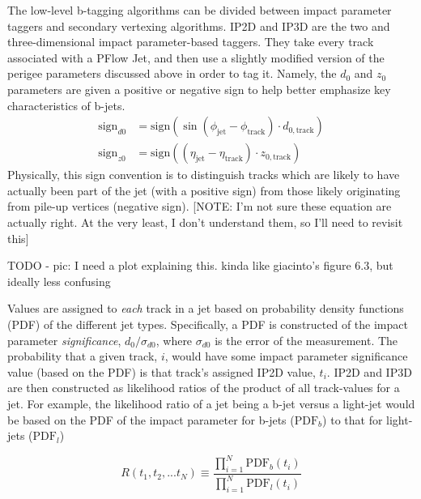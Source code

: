             The low-level b-tagging algorithms can be divided between impact parameter taggers and secondary vertexing algorithms.
            IP2D and IP3D are the two and three-dimensional impact parameter-based taggers.
            They take every track associated with a PFlow Jet,
                and then use a slightly modified version of the perigee parameters discussed above in order to tag it.
            Namely, the $d_0$ and $z_0$ parameters are given a positive or negative sign to help better emphasize key characteristics of b-jets\cite{thesis_giacinto}.
            \begin{equation} \begin{split}
                \textrm{sign}_{d0} &= \textrm{sign}(\sin(\phi_{\textrm{jet}} - \phi_{\textrm{track}}) \cdot d_{0,\textrm{track}}) \\
                \textrm{sign}_{z0} &= \textrm{sign}((\eta_{\textrm{jet}} - \eta_{\textrm{track}}) \cdot z_{0,\textrm{track}})
            \end{split} \end{equation}
            Physically, this sign convention is to distinguish tracks which are likely to have actually been part of the jet (with a positive sign)
                from those likely originating from pile-up vertices (negative sign).
            [NOTE: I'm not sure these equation are actually right. At the very least, I don't understand them, so I'll need to revisit this]

            TODO - pic: I need a plot explaining this. kinda like giacinto's figure 6.3, but ideally less confusing

            Values are assigned to \textit{each} track in a jet based on probability density functions (PDF) of the different jet types.
            Specifically, a PDF is constructed of the impact parameter \textit{significance}, $d_0/\sigma_{d0}$,
                where $\sigma_{d0}$ is the error of the measurement.
            The probability that a given track, $i$, would have some impact parameter significance value (based on the PDF)
                is that track's assigned IP2D value, $t_i$.
            IP2D and IP3D are then constructed as likelihood ratios of the product of all track-values for a jet.
            For example, the likelihood ratio of a jet being a b-jet versus a light-jet would be based on
                the PDF of the impact parameter for b-jets ($\textrm{PDF}_b$) to that for light-jets ($\textrm{PDF}_l$)

            \begin{equation}
                R(t_1, t_2, ... t_N) \equiv \frac{\prod_{i=1}^N \textrm{PDF}_b(t_i)}{\prod_{i=1}^N \textrm{PDF}_l(t_i)}
            \end{equation}


